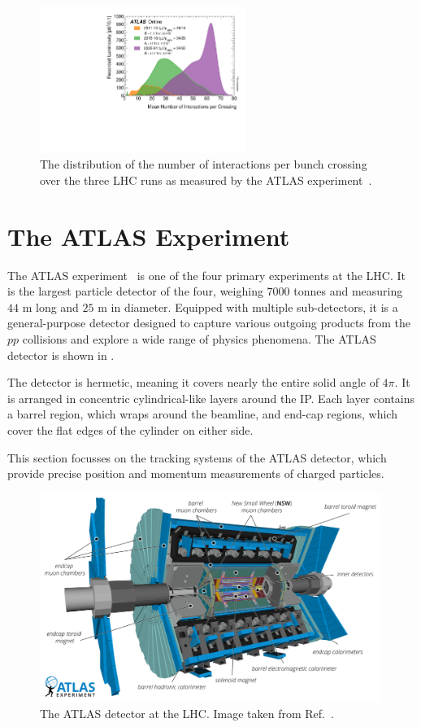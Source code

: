 \begin{figure}
    \centering
    \includegraphics[width=0.6\textwidth]{Figures/cern_atlas/mu_run123.pdf}
    \caption{The distribution of the number of interactions per bunch crossing over the three LHC runs as measured by the ATLAS experiment~\cite{run3data}.}
    \label{fig:pileup}
\end{figure}

\section{The ATLAS Experiment}

The ATLAS experiment~\cite{ATLAS, ATLASRun3} is one of the four primary experiments at the LHC\@.
It is the largest particle detector of the four, weighing $7000$ tonnes and measuring $44$ m long and $25$ m in diameter.
Equipped with multiple sub-detectors, it is a general-purpose detector designed to capture various outgoing products from the $pp$ collisions and explore a wide range of physics phenomena.
The ATLAS detector is shown in .

The detector is hermetic, meaning it covers nearly the entire solid angle of $4\pi$.
It is arranged in concentric cylindrical-like layers around the IP\@.
Each layer contains a barrel region, which wraps around the beamline, and end-cap regions, which cover the flat edges of the cylinder on either side.

This section focusses on the tracking systems of the ATLAS detector, which provide precise position and momentum measurements of charged particles.

\begin{figure}[htb]
    \centering
    \includegraphics[width=0.99\textwidth]{Figures/cern_atlas/ATLAS.png}
    \caption{The ATLAS detector at the LHC\@. Image taken from Ref.~\cite{ATLASRun3}.}
    \label{fig:atlas_detector}
\end{figure}

